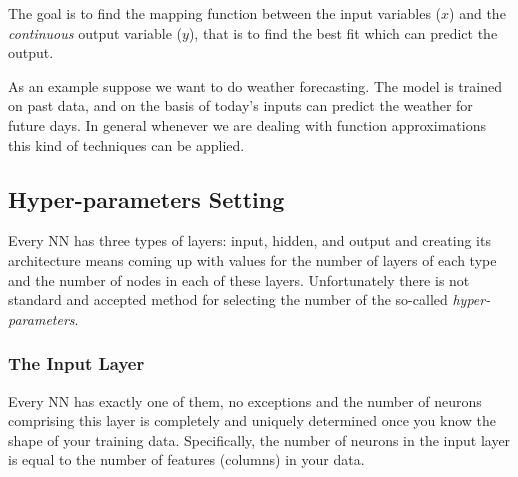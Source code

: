 The goal is to find the mapping function between the input variables ($x$) and the \emph{continuous} output variable ($y$), that is to find the best fit which can predict the output.

As an example suppose we want to do weather forecasting. The model is trained on past data, and on the basis of today's inputs can predict the weather for future days. In general whenever we are dealing with function approximations this kind of techniques can be applied.

\subsection{Hyper-parameters Setting}
\label{neural-network-design}

%
%

Every NN has three types of layers: input, hidden, and output and creating its architecture means coming up with values for the number of layers of each type and the number of nodes in each of these layers.
Unfortunately there is not standard and accepted method for selecting the number of the so-called \emph{hyper-parameters}. 

\subsubsection*{The Input Layer}

Every NN has exactly one of them, no exceptions and the number of neurons comprising this layer is completely and uniquely determined once you know the shape of your training data. Specifically, the number of neurons in the input layer is equal to the number of features (columns) in your data. 

